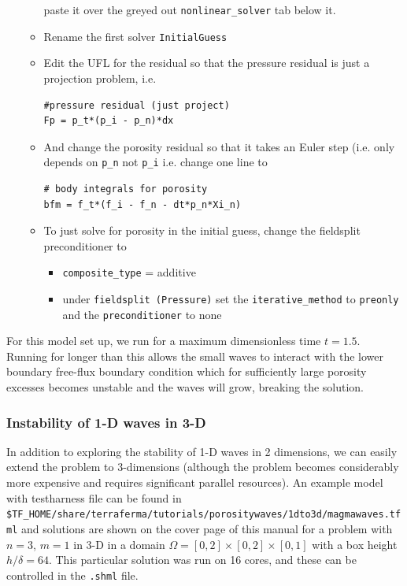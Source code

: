 \begin{itemize}
\begin{itemize}
    paste it over the greyed out \texttt{nonlinear\_solver} tab below
    it.
  \item Rename the first solver \texttt{InitialGuess}
  \item Edit the UFL for the residual so that the pressure residual is
    just a projection problem, i.e.
    \begin{lstlisting}[style=UFL]
#pressure residual (just project)
Fp = p_t*(p_i - p_n)*dx
    \end{lstlisting}
  \item And change the porosity residual so that it takes an Euler
    step (i.e. only depends on \texttt{p\_n} not \texttt{p\_i}
    i.e. change one line to
    \begin{lstlisting}[style=UFL]
# body integrals for porosity
bfm = f_t*(f_i - f_n - dt*p_n*Xi_n)
    \end{lstlisting}
  \item To just solve for porosity in the initial guess, change the
    fieldsplit preconditioner to
    \begin{itemize}
    \item \texttt{composite\_type} = additive
    \item under \texttt{fieldsplit (Pressure)} set the
      \texttt{iterative\_method} to \texttt{preonly} and the
      \texttt{preconditioner} to none
    \end{itemize}



  \end{itemize}



\end{itemize}
 

For this model set up, we run for a maximum dimensionless time
$t=1.5$.  Running for longer than this allows the small waves to
interact with the lower boundary free-flux boundary condition which
for sufficiently large porosity excesses becomes unstable and the
waves will grow, breaking the solution.

\subsubsection{Instability of 1-D waves in 3-D}
\label{sec:instability-1-d3d}

In addition to exploring the stability of 1-D waves in 2 dimensions,
we can easily extend the problem to 3-dimensions (although the problem
becomes considerably more expensive and requires significant parallel
resources).  An example model with testharness file can be found in
\texttt{\$TF\_HOME/share/terraferma/tutorials/porositywaves/1dto3d/magmawaves.tfml}
and solutions are shown on the cover page of this manual for a problem
with $n=3$, $m=1$ in 3-D in a domain
$\Omega=[0,2]\times[0,2]\times[0,1]$ with a box height $h/\delta =
64$.  This particular solution was run on 16 cores, and these can be
controlled in the \texttt{.shml} file.

